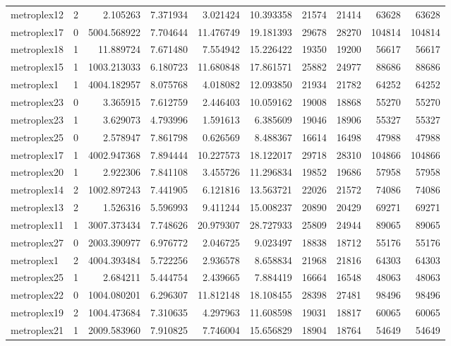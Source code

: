 \begin{longtable}{|l|r|r|r|r|r|r|r|r|r|}
metroplex12 & 2 & 2.105263 & 7.371934 & 3.021424 & 10.393358 & 21574 & 21414 & 63628 & 63628 \\
metroplex17 & 0 & 5004.568922 & 7.704644 & 11.476749 & 19.181393 & 29678 & 28270 & 104814 & 104814 \\
metroplex18 & 1 & 11.889724 & 7.671480 & 7.554942 & 15.226422 & 19350 & 19200 & 56617 & 56617 \\
metroplex15 & 1 & 1003.213033 & 6.180723 & 11.680848 & 17.861571 & 25882 & 24977 & 88686 & 88686 \\
metroplex1 & 1 & 4004.182957 & 8.075768 & 4.018082 & 12.093850 & 21934 & 21782 & 64252 & 64252 \\
metroplex23 & 0 & 3.365915 & 7.612759 & 2.446403 & 10.059162 & 19008 & 18868 & 55270 & 55270 \\
metroplex23 & 1 & 3.629073 & 4.793996 & 1.591613 & 6.385609 & 19046 & 18906 & 55327 & 55327 \\
metroplex25 & 0 & 2.578947 & 7.861798 & 0.626569 & 8.488367 & 16614 & 16498 & 47988 & 47988 \\
metroplex17 & 1 & 4002.947368 & 7.894444 & 10.227573 & 18.122017 & 29718 & 28310 & 104866 & 104866 \\
metroplex20 & 1 & 2.922306 & 7.841108 & 3.455726 & 11.296834 & 19852 & 19686 & 57958 & 57958 \\
metroplex14 & 2 & 1002.897243 & 7.441905 & 6.121816 & 13.563721 & 22026 & 21572 & 74086 & 74086 \\
metroplex13 & 2 & 1.526316 & 5.596993 & 9.411244 & 15.008237 & 20890 & 20429 & 69271 & 69271 \\
metroplex11 & 1 & 3007.373434 & 7.748626 & 20.979307 & 28.727933 & 25809 & 24944 & 89065 & 89065 \\
metroplex27 & 0 & 2003.390977 & 6.976772 & 2.046725 & 9.023497 & 18838 & 18712 & 55176 & 55176 \\
metroplex1 & 2 & 4004.393484 & 5.722256 & 2.936578 & 8.658834 & 21968 & 21816 & 64303 & 64303 \\
metroplex25 & 1 & 2.684211 & 5.444754 & 2.439665 & 7.884419 & 16664 & 16548 & 48063 & 48063 \\
metroplex22 & 0 & 1004.080201 & 6.296307 & 11.812148 & 18.108455 & 28398 & 27481 & 98496 & 98496 \\
metroplex19 & 2 & 1004.473684 & 7.310635 & 4.297963 & 11.608598 & 19031 & 18817 & 60065 & 60065 \\
metroplex21 & 1 & 2009.583960 & 7.910825 & 7.746004 & 15.656829 & 18904 & 18764 & 54649 & 54649 \\

\end{longtable}
